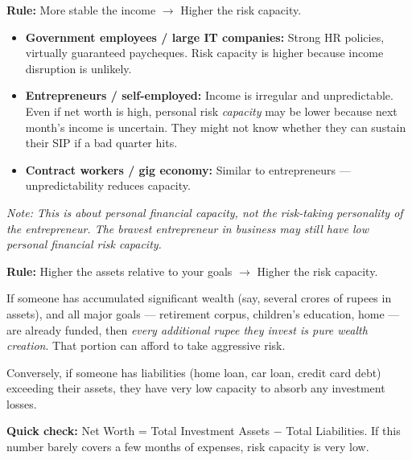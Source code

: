 \documentclass[12pt,a4paper]{article}
\newcommand{\faBriefcase}{\ding{115}}
\newcommand{\faChartLine}{\ding{116}}
\begin{document}
\vspace{3mm}

\begin{tcolorbox}[base, colback=AccentOrange!8, colframe=AccentOrange,
  title={\faBriefcase\;\textbf{Factor 3: Job / Income Stability}},
  fonttitle=\bfseries\color{white}, colbacktitle=AccentOrange]

\textbf{Rule:} More stable the income $\longrightarrow$ Higher the risk capacity.

\medskip
\begin{itemize}
  \item \textbf{Government employees / large IT companies:} Strong HR policies, virtually guaranteed paycheques. Risk capacity is higher because income disruption is unlikely.
  \item \textbf{Entrepreneurs / self-employed:} Income is irregular and unpredictable. Even if net worth is high, personal risk \textit{capacity} may be lower because next month's income is uncertain. They might not know whether they can sustain their SIP if a bad quarter hits.
  \item \textbf{Contract workers / gig economy:} Similar to entrepreneurs --- unpredictability reduces capacity.
\end{itemize}

\medskip
\textit{Note: This is about personal financial capacity, not the risk-taking personality of the entrepreneur. The bravest entrepreneur in business may still have low personal financial risk capacity.}
\end{tcolorbox}

\vspace{3mm}

\begin{tcolorbox}[base, colback=AccentPurple!8, colframe=AccentPurple,
  title={\faChartLine\;\textbf{Factor 4: Assets \& Liquidity}},
  fonttitle=\bfseries\color{white}, colbacktitle=AccentPurple]

\textbf{Rule:} Higher the assets relative to your goals $\longrightarrow$ Higher the risk capacity.

\medskip
If someone has accumulated significant wealth (say, several crores of rupees in assets), and all major goals --- retirement corpus, children's education, home --- are already funded, then \textit{every additional rupee they invest is pure wealth creation}. That portion can afford to take aggressive risk.

\medskip
Conversely, if someone has liabilities (home loan, car loan, credit card debt) exceeding their assets, they have very low capacity to absorb any investment losses.

\medskip
\textbf{Quick check:} Net Worth = Total Investment Assets $-$ Total Liabilities. If this number barely covers a few months of expenses, risk capacity is very low.
\end{tcolorbox}
\end{document}
